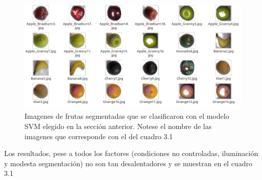 \documentclass[paper=letter, fontsize=11pt]{scrartcl}
\numberwithin{equation}{section} %
\numberwithin{figure}{section} %
\numberwithin{table}{section} %
\begin{document}
\begin{figure}[H]
  \begin{center}
    \includegraphics[scale =.5]{nuevamuestra.png}
    \caption{Imagenes de frutas segmentadas que se clasificaron con el modelo SVM elegido en la sección anterior. Notese el nombre de las imagenes que corresponde con el del cuadro 3.1}
    \label{figura3_3}
  \end{center}
\end{figure}

Los resultados, pese a todos los factores (condiciones no controladas, iluminación y modesta segmentación) no son tan desalentadores y se muestran en el cuadro 3.1
\end{document}
